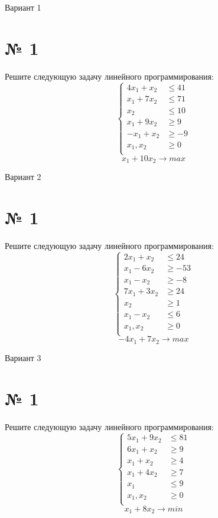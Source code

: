 \documentclass{article}%
\begin{document}
%
\normalsize%
\begin{center}%
\begin{Huge}%
Вариант 1%
\end{Huge}%
\end{center}%
\section*{№ 1}%
\label{sec:1}%
Решите следующую задачу линейного программирования: %
\[%
\left\{\begin{aligned}4x_{1}+x_{2} & \le41 \\x_{1}+7x_{2} & \le71 \\x_{2} & \le10 \\x_{1}+9x_{2} & \ge9 \\-x_{1}+x_{2} & \ge-9 \\x_{1},x_{2} & \ge 0 \\\end{aligned}\right.%
\]%
\[%
x_{1}+10x_{2}  \to max%
\]

%
\newpage%
\begin{center}%
\begin{Huge}%
Вариант 2%
\end{Huge}%
\end{center}%
\section*{№ 1}%
\label{sec:1}%
Решите следующую задачу линейного программирования: %
\[%
\left\{\begin{aligned}2x_{1}+x_{2} & \le24 \\x_{1}-6x_{2} & \ge-53 \\x_{1}-x_{2} & \ge-8 \\7x_{1}+3x_{2} & \ge24 \\x_{2} & \ge1 \\x_{1}-x_{2} & \le6 \\x_{1},x_{2} & \ge 0 \\\end{aligned}\right.%
\]%
\[%
-4x_{1}+7x_{2}  \to max%
\]

%
\newpage%
\begin{center}%
\begin{Huge}%
Вариант 3%
\end{Huge}%
\end{center}%
\section*{№ 1}%
\label{sec:1}%
Решите следующую задачу линейного программирования: %
\[%
\left\{\begin{aligned}5x_{1}+9x_{2} & \le81 \\6x_{1}+x_{2} & \ge9 \\x_{1}+x_{2} & \ge4 \\x_{1}+4x_{2} & \ge7 \\x_{1} & \le9 \\x_{1},x_{2} & \ge 0 \\\end{aligned}\right.%
\]%
\[%
x_{1}+8x_{2}  \to min%
\]
\end{document}
